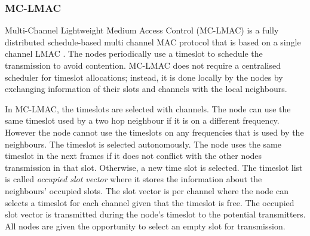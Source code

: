 

\subsubsection{MC-LMAC}
Multi-Channel Lightweight Medium Access Control (MC-LMAC) is a fully distributed schedule-based multi channel MAC protocol that is based on a single channel LMAC \cite{lmac}. The nodes periodically use a timeslot to schedule the transmission to avoid contention. MC-LMAC does not require a centralised scheduler for timeslot allocations; instead, it is done locally by the nodes by exchanging information of their slots and channels with the local neighbours. 

In MC-LMAC, the timeslots are selected with channels. The node can use the same timeslot used by a two hop neighbour if it is on a different frequency. However the node cannot use the timeslots on any frequencies that is used by the neighbours. The timeslot is selected autonomously. The node uses the same timeslot in the next frames if it does not conflict with the other nodes transmission in that slot. Otherwise, a new time slot is selected. The timeslot list is called \textit{occupied slot vector} where it stores the information about the neighbours' occupied slots. The slot vector is per channel where the node can selects a timeslot for each channel given that the timeslot is free.
The occupied slot vector is transmitted during the node's timeslot to the potential transmitters. All nodes are given the opportunity to select an empty slot for transmission.


